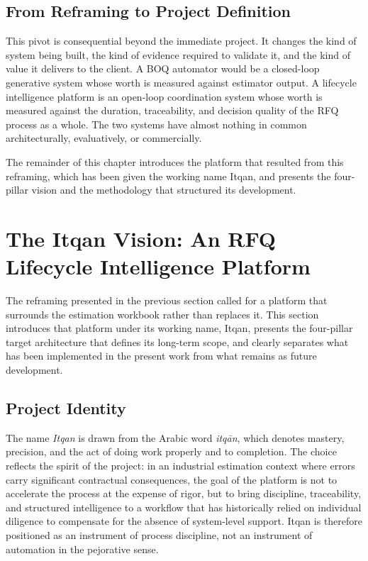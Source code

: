 \subsection*{From Reframing to Project Definition}
This pivot is consequential beyond the immediate project. It changes the kind of system being built, the kind of evidence required to validate it, and the kind of value it delivers to the client. A BOQ automator would be a closed-loop generative system whose worth is measured against estimator output. A lifecycle intelligence platform is an open-loop coordination system whose worth is measured against the duration, traceability, and decision quality of the RFQ process as a whole. The two systems have almost nothing in common architecturally, evaluatively, or commercially.

The remainder of this chapter introduces the platform that resulted from this reframing, which has been given the working name Itqan, and presents the four-pillar vision and the methodology that structured its development.

\section{The Itqan Vision: An RFQ Lifecycle Intelligence Platform}
The reframing presented in the previous section called for a platform that surrounds the estimation workbook rather than replaces it. This section introduces that platform under its working name, Itqan, presents the four-pillar target architecture that defines its long-term scope, and clearly separates what has been implemented in the present work from what remains as future development.

\subsection*{Project Identity}
The name \textit{Itqan} is drawn from the Arabic word \textit{itqān}, which denotes mastery, precision, and the act of doing work properly and to completion. The choice reflects the spirit of the project: in an industrial estimation context where errors carry significant contractual consequences, the goal of the platform is not to accelerate the process at the expense of rigor, but to bring discipline, traceability, and structured intelligence to a workflow that has historically relied on individual diligence to compensate for the absence of system-level support. Itqan is therefore positioned as an instrument of process discipline, not an instrument of automation in the pejorative sense.

